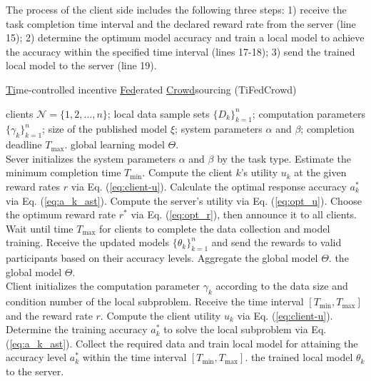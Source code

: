 \documentclass[final,1p,times]{elsarticle}
\begin{document}
The process of the client side includes the following three steps: 1) receive the task completion time interval and the declared reward rate from the server (line 15); 2) determine the optimum model accuracy and train a local model to achieve the accuracy within the specified time interval (lines 17-18); 3) send the trained local model to the server (line 19).

\begin{algorithm}[H]
	\caption{\underline {Ti}me-controlled incentive \underline{Fed}erated \underline{Crowd}sourcing (TiFedCrowd)}
	\label{Algo1}
	\begin{algorithmic}[1]
		\REQUIRE clients $\bm{\mathcal{N}} = \{1,2,\dots,n\}$; local data sample sets $\{D_k\}_{k=1}^n$; computation
		parameters $\{\gamma_k\}_{k=1}^n$; size of the published model $\xi$;  system parameters $\alpha$ and $\beta$; completion deadline $T_{\max}$.
		\ENSURE global learning model $\Theta$.\\
		\STATE Sever initializes the system parameters $\alpha$ and $\beta$ by the task type.
		\STATE Estimate the minimum completion time $T_{\min}$.
		\STATE Compute the client $k$’s utility $u_k$ at the given reward rates $r$ via Eq. (\ref{eq:client-u}).
		\STATE Calculate the optimal response accuracy $a_k^\ast$ via Eq. (\ref{eq:a_k_ast}).
		\ENDIF
		\ENDFOR
		\STATE Compute the server’s utility via Eq. (\ref{eq:opt_u}).
		\STATE Choose the optimum reward rate $r^\ast$ via Eq. (\ref{eq:opt_r}), then announce it to all clients.
		\STATE Wait until time $T_{\max}$ for clients to complete the data collection and model training.
		\STATE Receive the updated models $\{\theta_k\}_{k=1}^n$ and send the rewards to valid participants based on their accuracy levels. Aggregate the global model $\Theta$.
		\RETURN the global model $\Theta$.\\
		\STATE Client initializes the computation
		parameter $\gamma_k$ according to the data size and condition number of the local subproblem.
		\STATE Receive the time interval $[T_{\min},T_{\max}]$ and the reward rate $r$.
		\STATE Compute the client utility $u_k$ via Eq. (\ref{eq:client-u}).
		\STATE Determine the training accuracy $a_k^\ast$ to solve the local subproblem via Eq. (\ref{eq:a_k_ast}).
		\STATE Collect the required data and train local model for attaining the accuracy level $a_k^\ast$ within the time interval $[T_{\min},T_{\max}]$.
		\RETURN the trained local model $\theta_k$ to the server.
	\end{algorithmic}
\end{algorithm}
\end{document}
